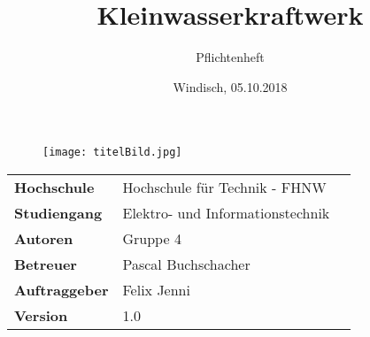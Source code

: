 \documentclass[final]{fhnwreport}       %
\title{Kleinwasserkraftwerk}          	%
\author{Pflichtenheft}          		%
\date{Windisch, 05.10.2018}             %
\begin{document}
\maketitle

\vspace*{-1cm}						    %
\vfill
\begin{figure}[H]
\centering
\texttt{[image: titelBild.jpg]}
\end{figure}
\vfill

{
\renewcommand\arraystretch{2}
\begin{center}
\begin{tabular}{ >{\bf} l p{10cm} l }
Hochschule&Hochschule für Technik - FHNW\\
Studiengang&Elektro- und Informationstechnik\\
Autoren&Gruppe 4\\%
Betreuer&Pascal Buchschacher\\
Auftraggeber&Felix Jenni\\
Version&1.0 %
\end{tabular}
\end{center}
}

\clearpage

\thispagestyle{empty}
			
\tableofcontents
\clearpage




%
%



{\sloppypar
{}	
\setlength{\bibitemsep}{\baselineskip}
\printbibliography[heading=bibintoc]
\label{sec:lit}
}

{%
}
\end{document}
